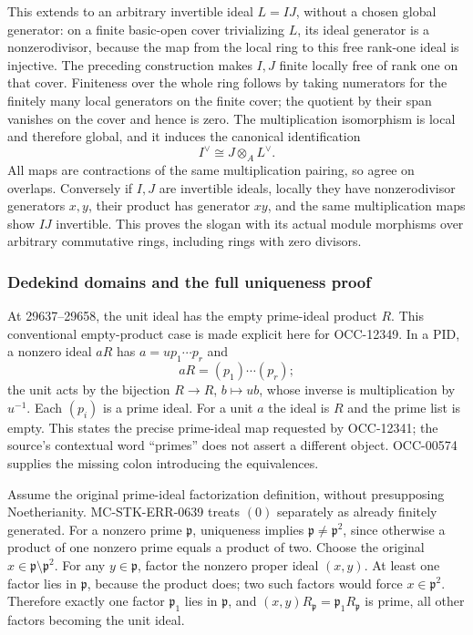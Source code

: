This extends to an arbitrary invertible ideal \(L=IJ\), without a chosen global generator: on a finite basic-open cover trivializing \(L\), its ideal generator is a nonzerodivisor, because the map from the local ring to this free rank-one ideal is injective. The preceding construction makes \(I,J\) finite locally free of rank one on that cover. Finiteness over the whole ring follows by taking numerators for the finitely many local generators on the finite cover; the quotient by their span vanishes on the cover and hence is zero. The multiplication isomorphism is local and therefore global, and it induces the canonical identification \[
 I^\vee\cong J\otimes_A L^\vee.
\] All maps are contractions of the same multiplication pairing, so agree on overlaps. Conversely if \(I,J\) are invertible ideals, locally they have nonzerodivisor generators \(x,y\), their product has generator \(xy\), and the same multiplication maps show \(IJ\) invertible. This proves the slogan with its actual module morphisms over arbitrary commutative rings, including rings with zero divisors.

\subsubsection{Dedekind domains and the full uniqueness proof}\label{algebra-proof-029-dedekind-domains-and-the-full-uniqueness-proof}

At 29637--29658, the unit ideal has the empty prime-ideal product \(R\). This conventional empty-product case is made explicit here for OCC-12349. In a PID, a nonzero ideal \(aR\) has \(a=u p_1\cdots p_r\) and \[
 aR=(p_1)\cdots(p_r);
\] the unit acts by the bijection \(R\to R\), \(b\mapsto ub\), whose inverse is multiplication by \(u^{-1}\). Each \((p_i)\) is a prime ideal. For a unit \(a\) the ideal is \(R\) and the prime list is empty. This states the precise prime-ideal map requested by OCC-12341; the source's contextual word ``primes'' does not assert a different object. OCC-00574 supplies the missing colon introducing the equivalences.

Assume the original prime-ideal factorization definition, without presupposing Noetherianity. MC-STK-ERR-0639 treats \((0)\) separately as already finitely generated. For a nonzero prime \(\mathfrak p\), uniqueness implies \(\mathfrak p\ne\mathfrak p^2\), since otherwise a product of one nonzero prime equals a product of two. Choose the original \(x\in\mathfrak p\setminus\mathfrak p^2\). For any \(y\in\mathfrak p\), factor the nonzero proper ideal \((x,y)\). At least one factor lies in \(\mathfrak p\), because the product does; two such factors would force \(x\in\mathfrak p^2\). Therefore exactly one factor \(\mathfrak p_1\) lies in \(\mathfrak p\), and \((x,y)R_{\mathfrak p}=\mathfrak p_1R_{\mathfrak p}\) is prime, all other factors becoming the unit ideal.

